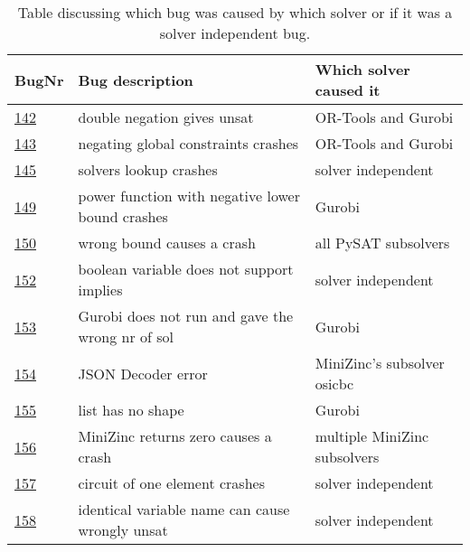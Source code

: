 \begin{table}[]
	\centering
	\caption{Table discussing which bug was caused by which solver or if it was a solver independent bug.}
	\label{tab:bug:Solver}
	\begin{tabular}{lll}
		\hline
		BugNr & Bug description                                           & Which solver caused it\\ \toprule
		\href{https://github.com/CPMpy/cpmpy/issues/142}{142} & double negation gives unsat                            & OR-Tools and Gurobi          \\
		\href{https://github.com/CPMpy/cpmpy/issues/143}{143} & negating global constraints crashes                 & OR-Tools and Gurobi          \\
		\href{https://github.com/CPMpy/cpmpy/issues/145}{145} & solvers lookup crashes                            & solver independent           \\
		\href{https://github.com/CPMpy/cpmpy/issues/149}{149} & power function with negative lower bound crashes  & Gurobi                       \\
		\href{https://github.com/CPMpy/cpmpy/issues/150}{150} & wrong bound causes a crash                  & all PySAT subsolvers         \\
		\href{https://github.com/CPMpy/cpmpy/issues/152}{152} & boolean variable does not support implies         & solver independent           \\
		\href{https://github.com/CPMpy/cpmpy/issues/153}{153} & Gurobi does not run and gave the wrong nr of sol  & Gurobi                       \\
		\href{https://github.com/CPMpy/cpmpy/issues/154}{154} & JSON Decoder error                                & MiniZinc’s subsolver osicbc  \\
		\href{https://github.com/CPMpy/cpmpy/issues/155}{155} & list has no shape                                 & Gurobi                       \\
		\href{https://github.com/CPMpy/cpmpy/issues/156}{156} & MiniZinc returns zero causes a crash              & multiple MiniZinc subsolvers \\
		\href{https://github.com/CPMpy/cpmpy/issues/157}{157} & circuit of one element crashes                    & solver independent           \\
		\href{https://github.com/CPMpy/cpmpy/issues/158}{158} & identical variable name can cause wrongly unsat   & solver independent           \\

\end{tabular}
\end{table}
